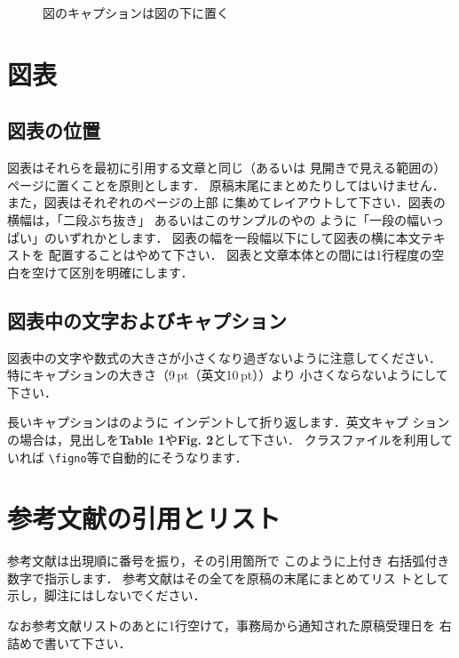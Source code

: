 \documentclass[dvipdfmx]{jsce}
\begin{document}
\begin{figure}
\begin{center}

\end{center}
\vspace*{-4mm}
\caption{図のキャプションは図の下に置く}\label{fig:1}
\end{figure}

\section{図表}

\subsection{図表の位置}

図表はそれらを最初に引用する文章と同じ（あるいは
見開きで見える範囲の）ページに置くことを原則とします．
原稿末尾にまとめたりしてはいけません．
また，図表はそれぞれのページの上部
に集めてレイアウトして下さい．図表の横幅は，「二段ぶち抜き」
あるいはこのサンプルの\tabno{\ref{tab:1}}や\figno{\ref{fig:1}}の
ように「一段の幅いっぱい」のいずれかとします．
図表の幅を一段幅以下にして図表の横に本文テキストを
配置することはやめて下さい．
図表と文章本体との間には1行程度の空白を空けて区別を明確にします．

\subsection{図表中の文字およびキャプション}

図表中の文字や数式の大きさが小さくなり過ぎないように注意してください．
特にキャプションの大きさ（9\,pt（英文10\,pt））より
小さくならないようにして下さい．

長いキャプションは\tabno{\ref{tab:1}}のように
インデントして折り返します．英文キャプ
ションの場合は，見出しを{\bf Table 1}や{\bf Fig. 2}として下さい．
クラスファイルを利用していれば \verb+\figno+等で自動的にそうなります．

\section{参考文献の引用とリスト}

参考文献は出現順に番号を振り，その引用箇所で
このように\cite{Hill1965,Blevins1998}上付き
右括弧付き数字で指示します．
参考文献はその全てを原稿の末尾にまとめてリス
トとして示し，脚注にはしないでください．

なお参考文献リストのあとに1行空けて，事務局から通知された原稿受理日を
右詰めで書いて下さい．
\end{document}
